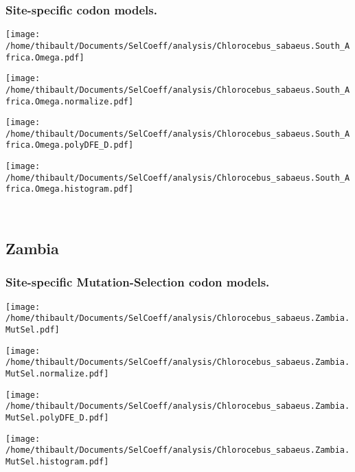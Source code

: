 \subsubsection*{Site-specific codon models.} 
\begin{minipage}{0.49\linewidth} 
\texttt{[image: /home/thibault/Documents/SelCoeff/analysis/Chlorocebus\_sabaeus.South\_Africa.Omega.pdf]} 
\end{minipage}
\begin{minipage}{0.49\linewidth} 
\texttt{[image: /home/thibault/Documents/SelCoeff/analysis/Chlorocebus\_sabaeus.South\_Africa.Omega.normalize.pdf]} 
\end{minipage}
\begin{minipage}{0.49\linewidth} 
\texttt{[image: /home/thibault/Documents/SelCoeff/analysis/Chlorocebus\_sabaeus.South\_Africa.Omega.polyDFE\_D.pdf]} 
\end{minipage}
\begin{minipage}{0.49\linewidth} 
\texttt{[image: /home/thibault/Documents/SelCoeff/analysis/Chlorocebus\_sabaeus.South\_Africa.Omega.histogram.pdf]} 
\end{minipage}
\\ 
\subsection{Zambia} 
 
\subsubsection*{Site-specific Mutation-Selection codon models.} 
\begin{minipage}{0.49\linewidth} 
\texttt{[image: /home/thibault/Documents/SelCoeff/analysis/Chlorocebus\_sabaeus.Zambia.MutSel.pdf]} 
\end{minipage}
\begin{minipage}{0.49\linewidth} 
\texttt{[image: /home/thibault/Documents/SelCoeff/analysis/Chlorocebus\_sabaeus.Zambia.MutSel.normalize.pdf]} 
\end{minipage}
\begin{minipage}{0.49\linewidth} 
\texttt{[image: /home/thibault/Documents/SelCoeff/analysis/Chlorocebus\_sabaeus.Zambia.MutSel.polyDFE\_D.pdf]} 
\end{minipage}
\begin{minipage}{0.49\linewidth} 
\texttt{[image: /home/thibault/Documents/SelCoeff/analysis/Chlorocebus\_sabaeus.Zambia.MutSel.histogram.pdf]} 
\end{minipage}
\\ 
